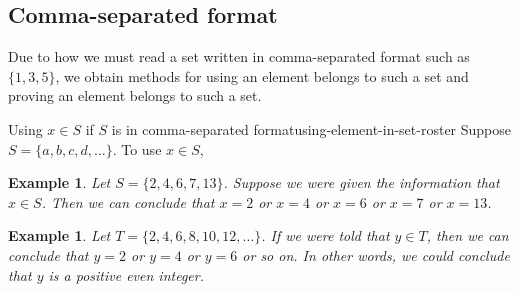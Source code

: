 \documentclass{book}
\newcounter{ekcounter}%
\theoremstyle{ekimcustom}
\newtheorem{example}[ekcounter]{Example}
\begin{document}
\subsection{Comma-separated format}

Due to how we must read a set written in comma-separated format such as $\{1,3,5\}$, we obtain methods for using an element belongs to such a set and proving an element belongs to such a set.

\begin{bmethod}{Using $x \in S$ if $S$ is in comma-separated format}{using-element-in-set-roster}
Suppose $S = \{a,b,c,d,\dots\}$. To use $x \in S$,
\begin{center}
\end{center}
\end{bmethod}
\begin{example}
Let $S = \{2, 4, 6, 7, 13\}$. Suppose we were given the information that $x \in S$. Then we can conclude that $x=2$ or $x=4$ or $x=6$ or $x=7$ or $x=13$. 
\end{example}
\begin{example}
Let $T = \{2, 4, 6, 8, 10, 12, \dots\}$. If we were told that $y \in T$, then we can conclude that $y = 2$ or $y=4$ or $y=6$ or so on. In other words, we could conclude that $y$ is a positive even integer.
\end{example}
\end{document}

